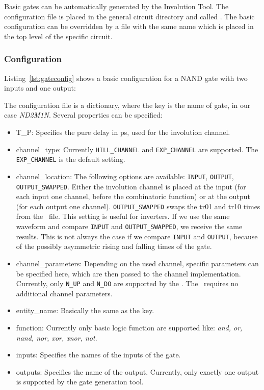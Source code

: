 Basic gates can be automatically generated by the Involution Tool. The
configuration file is placed in the general circuit directory and called
\gateconfigjson. The basic configuration can be overridden by a
file with the same name which is placed in the top level of the specific
circuit.

\subsubsection{Configuration}\label{sec:man-gate-configuration}

Listing~\ref{lst:gateconfig} shows a basic configuration for a NAND gate
with two inputs and one output:


The configuration file is a dictionary, where the key is the name of
gate, in our case \emph{ND2M1N}. Several properties can be specified: 
\begin{itemize}
\item T\_P: Specifies the pure delay in \si{\ps}, used for the 
involution channel. 
\item channel\_type: Currently \lstinline|HILL_CHANNEL| and 
\lstinline|EXP_CHANNEL| are supported. The \lstinline|EXP_CHANNEL| is the 
default setting.
\item channel\_location: The following options are available: 
\lstinline|INPUT|, \lstinline|OUTPUT|, \lstinline|OUTPUT_SWAPPED|. Either the 
involution channel is placed at the input (for each input one channel, before 
the combinatoric function) or at the output (for each output one channel). 
\lstinline|OUTPUT_SWAPPED| swaps the tr01 and tr10 times from the \sdffile\ 
file. This setting is useful for inverters. If we use the same waveform and 
compare \lstinline|INPUT| and \lstinline|OUTPUT_SWAPPED|, we receive the same 
results. This is not always the case if we compare \lstinline|INPUT| and 
\lstinline|OUTPUT|, because of the possibly asymmetric rising and falling times 
of the gate. 
\item channel\_parameters: Depending on the used channel, specific parameters 
can be specified here, which are then passed to the channel implementation. 
Currently, only \lstinline|N_UP| and \lstinline|N_DO| are supported by the 
\hillchannel. The \expchannel\ requires no additional channel parameters.
\item entity\_name:
Basically the same as the key. 
\item function: Currently only basic logic
function are supported like: \emph{and, or, nand, nor, xor, xnor, not}.
\item inputs: Specifies the names of the inputs of the gate. 
\item outputs: Specifies the name of the output. Currently, only exactly one output is
supported by the gate generation tool.
\end{itemize}


